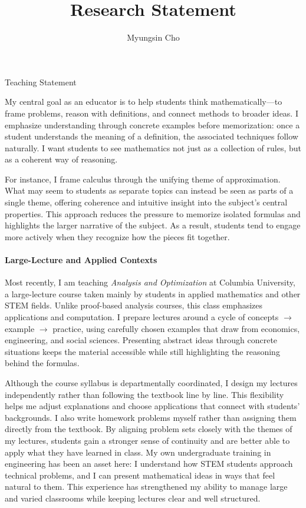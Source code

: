 \documentclass[11pt]{article}
\title{Research Statement}
\author{Myungsin Cho}
\date{}
\begin{document}
\begin{center}\LARGE{Teaching Statement}\end{center}

My central goal as an educator is to help students think mathematically—to frame problems, reason with definitions, and connect methods to broader ideas.
I emphasize understanding through concrete examples before memorization: once a student understands the meaning of a definition, the associated techniques follow naturally.
I want students to see mathematics not just as a collection of rules, but as a coherent way of reasoning.

For instance, I frame calculus through the unifying theme of approximation. 
What may seem to students as separate topics can instead be seen as parts of a single theme, offering coherence and intuitive insight into the subject’s central properties. 
This approach reduces the pressure to memorize isolated formulas and highlights the larger narrative of the subject. 
As a result, students tend to engage more actively when they recognize how the pieces fit together.

\paragraph{Large-Lecture and Applied Contexts}\quad 

Most recently, I am teaching {\it Analysis and Optimization} at Columbia University, a large-lecture course taken mainly by students in applied mathematics and other STEM fields. 
Unlike proof-based analysis courses, this class emphasizes applications and computation. 
I prepare lectures around a cycle of concepts $\to$ example $\to$ practice, using carefully chosen examples that draw from economics, engineering, and social sciences.
Presenting abstract ideas through concrete situations keeps the material accessible while still highlighting the reasoning behind the formulas.

Although the course syllabus is departmentally coordinated, I design my lectures independently rather than following the textbook line by line.
This flexibility helps me adjust explanations and choose applications that connect with students’ backgrounds.
I also write homework problems myself rather than assigning them directly from the textbook. 
By aligning problem sets closely with the themes of my lectures, students gain a stronger sense of continuity and are better able to apply what they have learned in class.
My own undergraduate training in engineering has been an asset here: I understand how STEM students approach technical problems, and I can present mathematical ideas in ways that feel natural to them. 
This experience has strengthened my ability to manage large and varied classrooms while keeping lectures clear and well structured.
\end{document}
